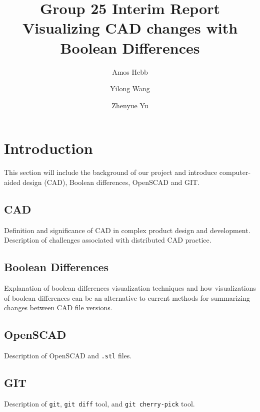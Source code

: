 \documentclass[sigconf,authorversion,nonacm]{acmart}
\begin{document}
\title{Group 25 Interim Report\\Visualizing CAD changes with Boolean Differences}

\author{Amos Hebb}
\author{Yilong Wang}
\author{Zhenyue Yu}
\makeatletter
\def\@ACM@checkaffil{%
	\if@ACM@instpresent\else
		\ClassWarningNoLine{\@classname}{No institution present for an affiliation}%
	\fi
	\if@ACM@citypresent\else
		\ClassWarningNoLine{\@classname}{No city present for an affiliation}%
	\fi
	\if@ACM@countrypresent\else
		\ClassWarningNoLine{\@classname}{No country present for an affiliation}%
	\fi
}
\makeatother

\maketitle

\section{Introduction}
This section will include the background of our project and introduce computer-aided design (CAD), Boolean differences, OpenSCAD and GIT.
\subsection{CAD}
Definition and significance of CAD in complex product design and development. Description of challenges associated with distributed CAD practice.
\subsection{Boolean Differences}
Explanation of boolean differences visualization techniques and how visualizations of boolean differences can be an alternative to current methods for summarizing changes between CAD file versions.
\subsection{OpenSCAD}
Description of OpenSCAD and \texttt{.stl} files.
\subsection{GIT}
Description of \texttt{git}, \texttt{git diff} tool, and \texttt{git cherry-pick} tool.
\end{document}
